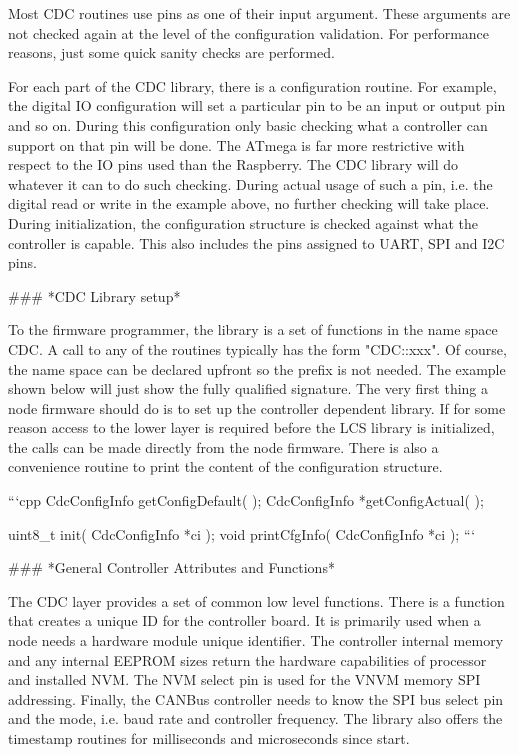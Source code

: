 Most CDC routines use pins as one of their input argument. These arguments are not checked again at the level of the configuration validation. For performance reasons, just some quick sanity checks are performed.

For each part of the CDC library, there is a configuration routine. For example, the digital IO configuration will set a particular pin to be an input or output pin and so on. During this configuration only basic checking what a controller can support on that pin will be done. The ATmega is far more restrictive with respect to the IO pins used than the Raspberry. The CDC library will do whatever it can to do such checking. During actual usage of such a pin, i.e. the digital read or write in the example above, no further checking will take place. During initialization, the configuration structure is checked against what the controller is capable. This also includes the pins assigned to UART, SPI and I2C pins.

### *CDC Library setup*

To the firmware programmer, the library is a set of functions in the name space CDC. A call to any of the routines typically has the form "CDC::xxx". Of course, the name space can be declared upfront so the prefix is not needed. The example shown below will just show the fully qualified signature. The very first thing a node firmware should do is to set up the controller dependent library. If for some reason access to the lower layer is required before the LCS library is initialized, the calls can be made directly from the node firmware. There is also a convenience routine to print the content of the configuration structure.

```cpp
   CdcConfigInfo getConfigDefault( );
   CdcConfigInfo *getConfigActual( );

   uint8_t       init( CdcConfigInfo *ci );
   void          printCfgInfo( CdcConfigInfo *ci );
```

### *General Controller Attributes and Functions*

The CDC layer provides a set of common low level functions. There is a function that creates a unique ID for the controller board. It is primarily used when a node needs a hardware module unique identifier. The controller internal memory and any internal EEPROM sizes return the hardware capabilities of processor and installed NVM. The NVM select pin is used for the VNVM memory SPI addressing. Finally, the CANBus controller needs to know the SPI bus select pin and the mode, i.e. baud rate and controller frequency. The library also offers the timestamp routines for milliseconds and microseconds since start.


